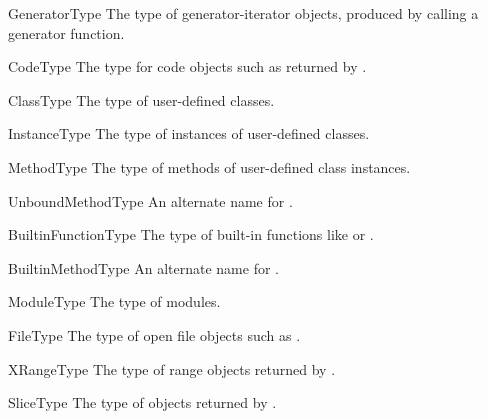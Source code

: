 \begin{datadesc}{GeneratorType}
The type of generator-iterator objects, produced by calling a
generator function.
\end{datadesc}

\begin{datadesc}{CodeType}
The type for code objects such as returned by
.
\end{datadesc}

\begin{datadesc}{ClassType}
The type of user-defined classes.
\end{datadesc}

\begin{datadesc}{InstanceType}
The type of instances of user-defined classes.
\end{datadesc}

\begin{datadesc}{MethodType}
The type of methods of user-defined class instances.
\end{datadesc}

\begin{datadesc}{UnboundMethodType}
An alternate name for .
\end{datadesc}

\begin{datadesc}{BuiltinFunctionType}
The type of built-in functions like  or
.
\end{datadesc}

\begin{datadesc}{BuiltinMethodType}
An alternate name for .
\end{datadesc}

\begin{datadesc}{ModuleType}
The type of modules.
\end{datadesc}

\begin{datadesc}{FileType}
The type of open file objects such as .
\end{datadesc}

\begin{datadesc}{XRangeType}
The type of range objects returned by
.
\end{datadesc}

\begin{datadesc}{SliceType}
The type of objects returned by
.
\end{datadesc}

